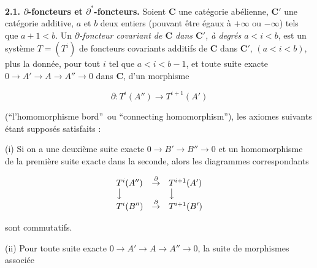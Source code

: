 \textbf{2.1. $\partial$-foncteurs et
$\partial^*$-foncteurs.}
Soient $\mathbf{C}$ une catégorie abélienne, $\mathbf{C}'$ une catégorie additive, $a$ et $b$
deux entiers (pouvant être égaux à $+\infty$ ou $-\infty$) tels que
$a+1<b$. Un \textit{$\partial$-foncteur covariant de $\mathbf{C}$ dans $\mathbf{C}'$, à degrés
$a<i<b$}, est un système $T=(T^i)$ de foncteurs covariants additifs de $\mathbf{C}$
dans $\mathbf{C}'$, $(a<i<b)$, plus la donnée, pour tout $i$ tel que $a<i<b-1$, et
toute suite exacte
$0\to A'\to A\to A''\to 0$
dans $\mathbf{C}$, d'un morphisme

\[
 \partial:T^i(A'')\to T^{i+1}(A')
\]

\noindent (\textquotedblleft l'homomorphisme bord\textquotedblright\ ou
\textquotedblleft connecting homomorphism\textquotedblright), les axiomes
suivants étant supposés satisfaits :

 (i) Si on a une deuxième suite exacte
$0\to B'\to B''\to 0$ et un
homomorphisme de la première suite exacte dans la seconde, alors les
diagrammes correspondants

\[
\begin{array}{lcl}
T^i(A'') & \mathop{\to}\limits^{\partial} & T^{i+1}(A')\\
\big\downarrow && \big\downarrow\\
T^i(B'') & \mathop{\to}\limits^{\partial} & T^{i+1}(B')
\end{array}
\]

\noindent sont commutatifs.

 (ii) Pour toute suite exacte
$0\to A'\to A\to A''\to 0$,
la suite de morphismes associée


